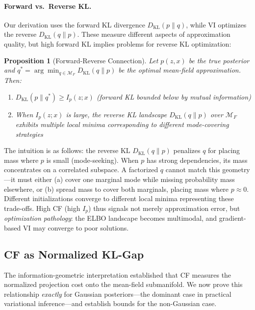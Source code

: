 \documentclass[10pt]{article} %
\theoremstyle{plain}
\newtheorem{proposition}[theorem]{Proposition}
\theoremstyle{definition}
\newcommand{\MI}{I}
\newcommand{\KL}{D_{\mathrm{KL}}}
\begin{document}
\paragraph{Forward vs.\ Reverse KL.} Our derivation uses the forward KL divergence $\KL(p \| q)$, while VI optimizes the reverse $\KL(q \| p)$. These measure different aspects of approximation quality, but high forward KL implies problems for reverse KL optimization:

\begin{proposition}[Forward-Reverse Connection]
\label{prop:forward-reverse}
Let $p(z,x)$ be the true posterior and $q^* = \arg\min_{q \in \mathcal{M}_F} \KL(q \| p)$ be the optimal mean-field approximation. Then:
\begin{enumerate}
    \item $\KL(p \| q^*) \geq \MI_p(z;x)$ (forward KL bounded below by mutual information)
    \item When $\MI_p(z;x)$ is large, the reverse KL landscape $\KL(q \| p)$ over $\mathcal{M}_F$ exhibits multiple local minima corresponding to different mode-covering strategies
\end{enumerate}
\end{proposition}

The intuition is as follows: the reverse KL $\KL(q\|p)$ penalizes $q$ for placing mass where $p$ is small (mode-seeking). When $p$ has strong dependencies, its mass concentrates on a correlated subspace. A factorized $q$ cannot match this geometry---it must either (a) cover one marginal mode while missing probability mass elsewhere, or (b) spread mass to cover both marginals, placing mass where $p \approx 0$. Different initializations converge to different local minima representing these trade-offs. High CF (high $\MI_p$) thus signals not merely approximation error, but \emph{optimization pathology}: the ELBO landscape becomes multimodal, and gradient-based VI may converge to poor solutions.

\subsection{CF as Normalized KL-Gap}
\label{sec:kl-gap}

The information-geometric interpretation established that CF measures the normalized projection cost onto the mean-field submanifold. We now prove this relationship \emph{exactly} for Gaussian posteriors---the dominant case in practical variational inference---and establish bounds for the non-Gaussian case.
\end{document}
